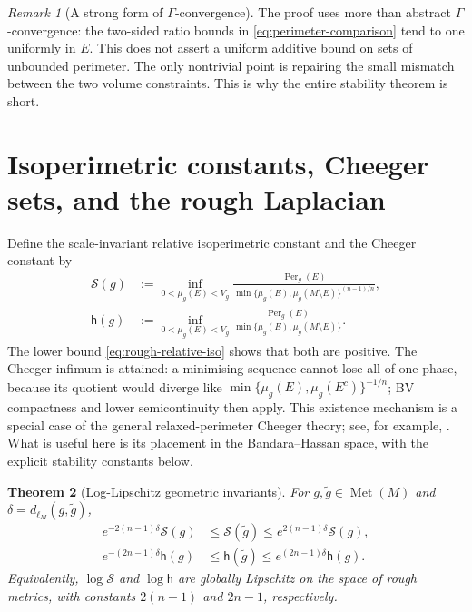 \documentclass[11pt]{amsart}
\newtheorem{theorem}{Theorem}[section]
\theoremstyle{definition}
\theoremstyle{remark}
\newtheorem{remark}[theorem]{Remark}
\newcommand{\Met}{\operatorname{Met}}
\newcommand{\dMet}{d_{\ell_M}}
\newcommand{\Per}{\operatorname{Per}}
\newcommand{\cS}{\mathcal S}
\newcommand{\hch}{\mathsf h}
\begin{document}
\begin{remark}[A strong form of $\Gamma$-convergence]
The proof uses more than abstract $\Gamma$-convergence: the two-sided ratio
bounds in \eqref{eq:perimeter-comparison} tend to one uniformly in $E$.  This
does not assert a uniform additive bound on sets of unbounded perimeter.  The
only nontrivial point is repairing the small mismatch between the two volume
constraints.  This is why the entire stability theorem is short.
\end{remark}

\section{Isoperimetric constants, Cheeger sets, and the rough Laplacian}

Define the scale-invariant relative isoperimetric constant and the Cheeger
constant by
\begin{align}
 \cS(g)&:=\inf_{0<\mu_g(E)<V_g}
 \frac{\Per_g(E)}
 {\min\{\mu_g(E),\mu_g(M\setminus E)\}^{(n-1)/n}},
 \label{eq:S-constant}\\
 \hch(g)&:=\inf_{0<\mu_g(E)<V_g}
 \frac{\Per_g(E)}
 {\min\{\mu_g(E),\mu_g(M\setminus E)\}}.
 \label{eq:Cheeger-constant}
\end{align}
The lower bound \eqref{eq:rough-relative-iso} shows that both are positive.
The Cheeger infimum is attained: a minimising sequence cannot lose all of
one phase, because its quotient would diverge like
$\min\{\mu_g(E),\mu_g(E^c)\}^{-1/n}$; BV compactness and lower
semicontinuity then apply.  This existence mechanism is a special case of the
general relaxed-perimeter Cheeger theory; see, for example,
\cite{FranceschiPinamontiSaraccoStefani2024}.  What is useful here is its
placement in the Bandara--Hassan space, with the explicit stability constants
below.

\begin{theorem}[Log-Lipschitz geometric invariants]
\label{thm:geometric-log-Lipschitz}
For $g,\widetilde g\in\Met(M)$ and
$\delta=\dMet(g,\widetilde g)$,
\begin{align}
 e^{-2(n-1)\delta}\cS(g)
 &\leq\cS(\widetilde g)
 \leq e^{2(n-1)\delta}\cS(g),
 \label{eq:S-stability}\\
 e^{-(2n-1)\delta}\hch(g)
 &\leq\hch(\widetilde g)
 \leq e^{(2n-1)\delta}\hch(g).
 \label{eq:h-stability}
\end{align}
Equivalently, $\log\cS$ and $\log\hch$ are globally Lipschitz on the
space of rough metrics, with constants $2(n-1)$ and $2n-1$, respectively.
\end{theorem}
\end{document}
